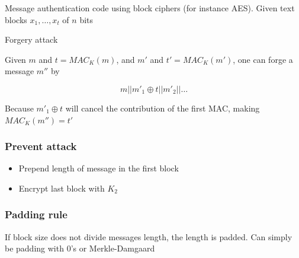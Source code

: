 Message authentication code using block ciphers (for instance
AES). Given text blocks $x_1, \ldots, x_t$ of $n$ bits

Forgery attack

Given $m$ and $t = MAC_K(m)$, and $m'$ and $t' = MAC_K(m')$, one can forge a message $m''$ by

\[ m || m'_1 \oplus t || m'_2 || \ldots \]

Because $m'_1 \oplus t$ will cancel the contribution of the first MAC, making $MAC_K(m'') = t'$

\subsubsection{Prevent attack}
\begin{itemize}
\item Prepend length of message in the first block
\item Encrypt last block with $K_2$
\end{itemize}

\subsubsection{Padding rule}

If block size does not divide messages length, the length is
padded. Can simply be padding with 0's or Merkle-Damgaard
